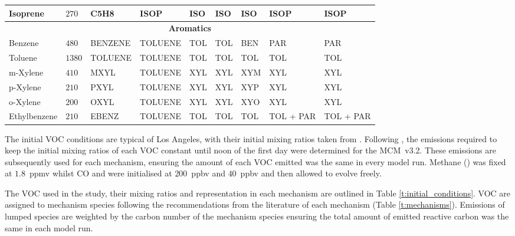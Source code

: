 \begin{sidewaystable}
\begin{tabular}{lllllllll}
        Isoprene & $270$ & C5H8 & ISOP & ISO & ISO & ISO & ISOP & ISOP \\ \hline
        \multicolumn{9}{c}{\textbf{Aromatics}} \\ \hline 
        Benzene & $480$ & BENZENE & TOLUENE & TOL & TOL & BEN & PAR & PAR \\
        Toluene & $1380$ & TOLUENE & TOLUENE & TOL & TOL & TOL & TOL & TOL \\
        m-Xylene & $410$ & MXYL & TOLUENE & XYL & XYL & XYM & XYL & XYL \\
        p-Xylene & $210$ & PXYL & TOLUENE & XYL & XYL & XYP & XYL & XYL \\
        o-Xylene & $200$ & OXYL & TOLUENE & XYL & XYL & XYO & XYL & XYL \\
        Ethylbenzene & $210$ & EBENZ & TOLUENE & TOL & TOL & TOL & TOL + PAR & TOL + PAR \\ \hline \hline
    \end{tabular}
    \vspace{1mm}
    \caption{VOC present in Los Angeles, mixing ratios taken from \citet{Baker:2008} and their representation in each chemical mechanism. The representation of the VOC in each mechanism is based upon the recommendations of the literature for each mechanism.}
    \vspace{-4mm}
    \label{t:initial_conditions}
\end{sidewaystable}

The initial VOC conditions are typical of Los Angeles, with their initial mixing ratios taken from \citet{Baker:2008}. 
Following \citet{Butler:2011}, the emissions required to keep the initial mixing ratios of each VOC constant until noon of the first day were determined for the \mbox{MCM v3.2.}
These emissions are subsequently used for each mechanism, ensuring the amount of each VOC emitted was the same in every model run.
Methane () was fixed at \mbox{$1.8$ ppmv} whilst CO and  were initialised at \mbox{$200$ ppbv} and \mbox{$40$ ppbv} and then allowed to evolve freely.

The VOC used in the study, their mixing ratios and representation in each mechanism are outlined in Table \ref{t:initial_conditions}.
VOC are assigned to mechanism species following the recommendations from the literature of each mechanism (Table \ref{t:mechanisms}).
Emissions of lumped species are weighted by the carbon number of the mechanism species ensuring the total amount of emitted reactive carbon was the same in each model run.

